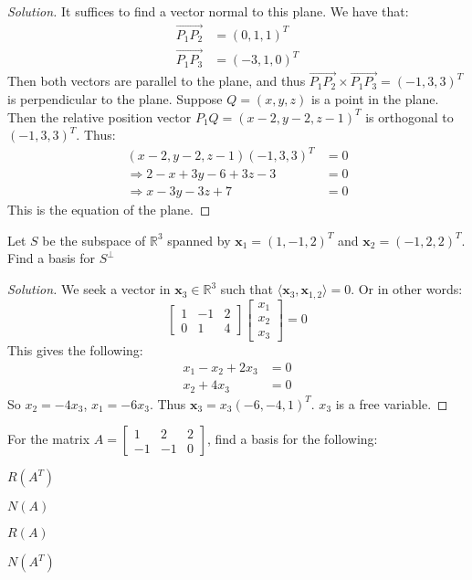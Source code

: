 \documentclass[../main.tex]{subfiles}
\begin{document}
\begin{proof}[Solution]
It suffices to find a vector normal to this plane. We have that:
\begin{align*}
    \overrightarrow{P_1P_2} &= (0,1,1)^T\\
    \overrightarrow{P_1P_3} &= (-3,1,0)^T
\end{align*}
Then both vectors are parallel to the plane, and thus $\overrightarrow{P_1P_2}\times \overrightarrow{P_1P_3}=(-1,3,3)^T$ is perpendicular to the plane. Suppose $Q=(x,y,z)$ is a point in the plane. Then the relative position vector $P_1 Q = (x-2,y-2,z-1)^T$ is orthogonal to $(-1,3,3)^T$. Thus:
\begin{align*}
    (x-2,y-2,z-1)(-1,3,3)^T &= 0\\
    \Rightarrow 2-x+3y-6+3z-3 &= 0\\
    \Rightarrow x-3y-3z +7 &= 0   
\end{align*}
This is the equation of the plane.
\end{proof}
%
\begin{problem}
Let $S$ be the subspace of $\mathbb{R}^3$ spanned by $\mathbf{x}_1 = (1,-1,2)^T$ and $\mathbf{x}_2 = (-1,2,2)^T$. Find a basis for $S^{\perp}$
\end{problem}
\begin{proof}[Solution]
We seek a vector in $\mathbf{x}_3\in\mathbb{R}^3$ such that $\langle \mathbf{x}_3, \mathbf{x}_{1,2}\rangle = 0$. Or in other words:
%
\begin{equation*}
    \begin{bmatrix} 1 & -1 & 2 \\ 0 & 1 & 4 \end{bmatrix} \begin{bmatrix} x_1 \\ x_2 \\ x_3 \end{bmatrix} = 0    
\end{equation*}
%
This gives the following:
%
\begin{align*}
x_1 - x_2 + 2x_3 &= 0\\
	x_2 + 4x_3 &= 0
\end{align*}
So $x_2 = -4x_3$, $x_1=-6x_3$. Thus $\mathbf{x}_3 = x_3(-6,-4,1)^T$. $x_3$ is a free variable.
\end{proof}
%
\begin{problem}
For the matrix $A = \begin{bmatrix} 1 & 2 & 2 \\ -1 & -1 & 0 \end{bmatrix}$, find a basis for the following:
\begin{enumerate}
\begin{multicols}{4}
\item $R(A^T)$
\item $N(A)$
\item $R(A)$
\item $N(A^T)$
\end{multicols}
\end{enumerate}
\end{problem}
\end{document}

